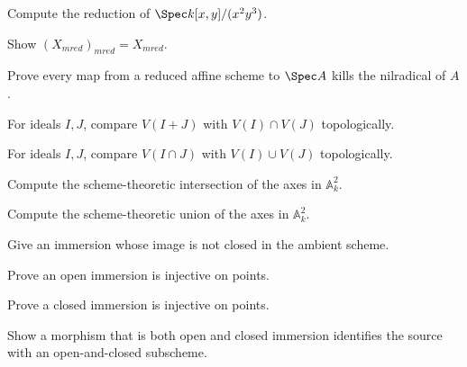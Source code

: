 \begin{exercise}\label{exr:vi22-12}
Compute the reduction of $\Spec k[x,y]/(x^2y^3)$.
\end{exercise}

\begin{exercise}\label{exr:vi22-13}
Show $(X_{
m red})_{
m red}=X_{
m red}$.
\end{exercise}

\begin{exercise}\label{exr:vi22-14}
Prove every map from a reduced affine scheme to $\Spec A$ kills the nilradical of $A$.
\end{exercise}

\begin{exercise}\label{exr:vi22-15}
For ideals $I,J$, compare $V(I+J)$ with $V(I)\cap V(J)$ topologically.
\end{exercise}

\begin{exercise}\label{exr:vi22-16}
For ideals $I,J$, compare $V(I\cap J)$ with $V(I)\cup V(J)$ topologically.
\end{exercise}

\begin{exercise}\label{exr:vi22-17}
Compute the scheme-theoretic intersection of the axes in $\mathbb A^2_k$.
\end{exercise}

\begin{exercise}\label{exr:vi22-18}
Compute the scheme-theoretic union of the axes in $\mathbb A^2_k$.
\end{exercise}

\begin{exercise}\label{exr:vi22-19}
Give an immersion whose image is not closed in the ambient scheme.
\end{exercise}

\begin{exercise}\label{exr:vi22-20}
Prove an open immersion is injective on points.
\end{exercise}

\begin{exercise}\label{exr:vi22-21}
Prove a closed immersion is injective on points.
\end{exercise}

\begin{exercise}\label{exr:vi22-22}
Show a morphism that is both open and closed immersion identifies the source with an open-and-closed subscheme.
\end{exercise}

